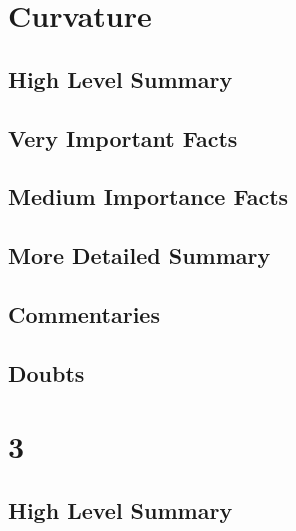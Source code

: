 \documentclass[12pt]{report}
\begin{document}
\chapter{Curvature}
\section{High Level Summary}

\section{Very Important Facts}

\section{Medium Importance Facts}

\section{More Detailed Summary}

\section{Commentaries}

\section{Doubts}


\chapter{3}
\section{High Level Summary}
\end{document}
